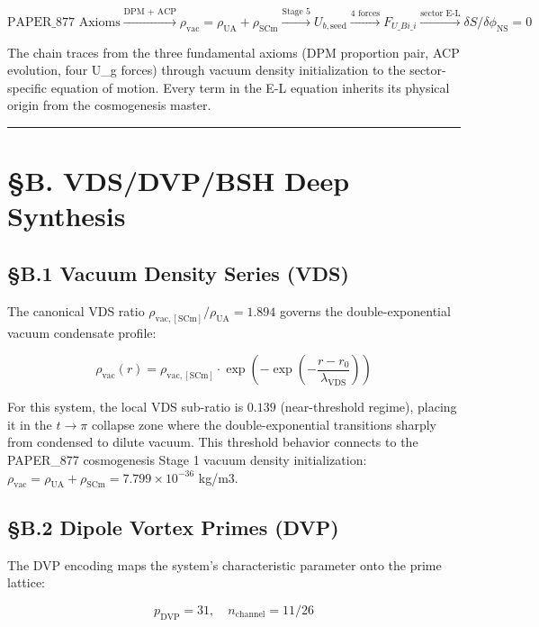 \documentclass[12pt,a4paper]{article}
\begin{document}
\begin{equation}
\text{PAPER\_877 Axioms} \xrightarrow{\text{DPM + ACP}} \rho_{\mathrm{vac}} = \rho_{\mathrm{UA}} + \rho_{\mathrm{SCm}} \xrightarrow{\text{Stage 5}} U_{b,\mathrm{seed}} \xrightarrow{\text{4 forces}} F_{U\_Bi\_i} \xrightarrow{\text{sector E-L}} \delta S/\delta \phi_{\mathrm{NS}} = 0
\end{equation}

The chain traces from the three fundamental axioms (DPM proportion pair, ACP evolution, four U\_g forces) through vacuum density initialization to the sector-specific equation of motion. Every term in the E-L equation inherits its physical origin from the cosmogenesis master.

\medskip\hrule\medskip

\section{\S{}B. VDS/DVP/BSH Deep Synthesis}

\subsection{\S{}B.1 Vacuum Density Series (VDS)}

The canonical VDS ratio $\rho_{\mathrm{vac,[SCm]}} / \rho_{\mathrm{UA}} = 1.894$ governs the double-exponential vacuum condensate profile:

\begin{equation}
\rho_{\mathrm{vac}}(r) = \rho_{\mathrm{vac,[SCm]}} \cdot \exp\!\left(-\exp\!\left(-\frac{r - r_0}{\lambda_{\mathrm{VDS}}}\right)\right)
\end{equation}

For this system, the local VDS sub-ratio is $0.139$ (near-threshold regime), placing it in the $t \to \pi$ collapse zone where the double-exponential transitions sharply from condensed to dilute vacuum. This threshold behavior connects to the PAPER\_877 cosmogenesis Stage 1 vacuum density initialization: $\rho_{\mathrm{vac}} = \rho_{\mathrm{UA}} + \rho_{\mathrm{SCm}} = 7.799 \times 10^{-36}$ kg/m3.

\subsection{\S{}B.2 Dipole Vortex Primes (DVP)}

The DVP encoding maps the system's characteristic parameter onto the prime lattice:

\begin{equation}
p_{\mathrm{DVP}} = 31, \quad n_{\mathrm{channel}} = 11/26
\end{equation}
\end{document}
